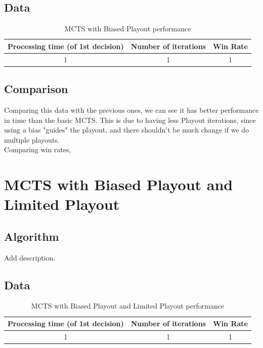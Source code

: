 \documentclass{article}
\begin{document}
  \subsection{Data}
  \begin{table}[h!]
    \centering
    \caption{MCTS with Biased Playout performance}
    \label{tab:tableBiasedMCTS1}
    \begin{tabular}{c|c|c}
      \textbf{Processing time (of 1st decision)} & \textbf{Number of iterations} & \textbf{Win Rate}\\
      \hline
      1 & 1 & 1
    \end{tabular}
  \end{table}

  \subsection{Comparison}
  Comparing this data with the previous ones, we can see it has better performance in time than the basic MCTS. This is due to having less Playout iterations,
  since using a bias "guides" the playout, and there shouldn't be much change if we do multiple playouts.\\
  Comparing win rates,

  \section{MCTS with Biased Playout and Limited Playout}

  \subsection{Algorithm}
  Add description.\\
  
  \subsection{Data}
  \begin{table}[h!]
    \centering
    \caption{MCTS with Biased Playout and Limited Playout performance}
    \label{tab:tableLimitedBiasedMCTS1}
    \begin{tabular}{c|c|c}
      \textbf{Processing time (of 1st decision)} & \textbf{Number of iterations} & \textbf{Win Rate}\\
      \hline
      1 & 1 & 1
    \end{tabular}
  \end{table}
\end{document}
